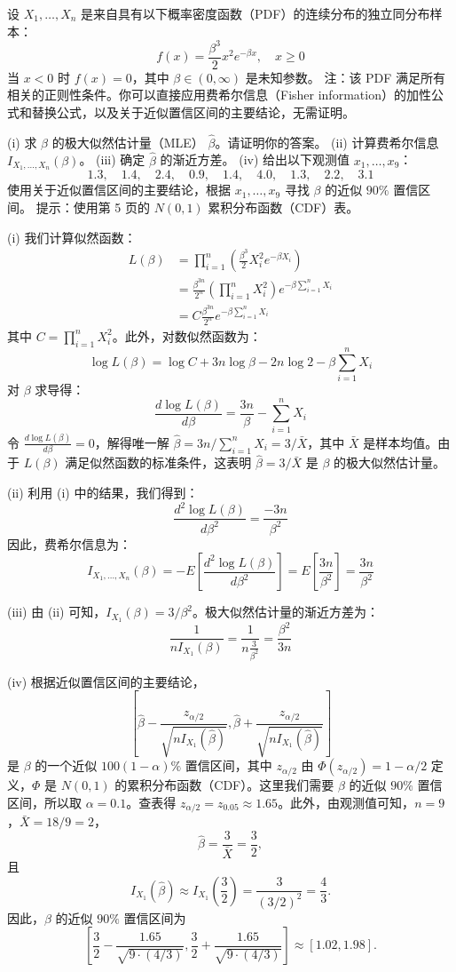 \begin{questions}
\question
设 $X_1, \dots, X_n$ 是来自具有以下概率密度函数（PDF）的连续分布的独立同分布样本：
\[
f(x) = \frac{\beta^3}{2} x^2 e^{-\beta x}, \quad x \ge 0
\]
当 $x < 0$ 时 $f(x) = 0$，其中 $\beta \in (0, \infty)$ 是未知参数。
注：该 PDF 满足所有相关的正则性条件。你可以直接应用费希尔信息（Fisher information）的加性公式和替换公式，以及关于近似置信区间的主要结论，无需证明。

(i) 求 $\beta$ 的极大似然估计量（MLE） $\hat{\beta}$。请证明你的答案。
(ii) 计算费希尔信息 $I_{X_1, \dots, X_n}(\beta)$。
(iii) 确定 $\hat{\beta}$ 的渐近方差。
(iv) 给出以下观测值 $x_1, \dots, x_9$：
\[
1.3, \quad 1.4, \quad 2.4, \quad 0.9, \quad 1.4, \quad 4.0, \quad 1.3, \quad 2.2, \quad 3.1
\]
使用关于近似置信区间的主要结论，根据 $x_1, \dots, x_9$ 寻找 $\beta$ 的近似 $90\%$ 置信区间。
提示：使用第 5 页的 $N(0, 1)$ 累积分布函数（CDF）表。

\begin{solution}
(i) 我们计算似然函数：
\begin{align*}
L(\beta) &= \prod_{i=1}^n \left( \frac{\beta^3}{2} X_i^2 e^{-\beta X_i} \right) \\
&= \frac{\beta^{3n}}{2^n} \left( \prod_{i=1}^n X_i^2 \right) e^{-\beta \sum_{i=1}^n X_i} \\
&= C \frac{\beta^{3n}}{2^n} e^{-\beta \sum_{i=1}^n X_i}
\end{align*}
其中 $C = \prod_{i=1}^n X_i^2$。此外，对数似然函数为：
\[
\log L(\beta) = \log C + 3n \log \beta - 2n \log 2 - \beta \sum_{i=1}^n X_i
\]
对 $\beta$ 求导得：
\[
\frac{d \log L(\beta)}{d\beta} = \frac{3n}{\beta} - \sum_{i=1}^n X_i
\]
令 $\frac{d \log L(\beta)}{d\beta} = 0$，解得唯一解 $\hat{\beta} = 3n / \sum_{i=1}^n X_i = 3/\bar{X}$，其中 $\bar{X}$ 是样本均值。由于 $L(\beta)$ 满足似然函数的标准条件，这表明 $\hat{\beta} = 3/\bar{X}$ 是 $\beta$ 的极大似然估计量。

(ii) 利用 (i) 中的结果，我们得到：
\[
\frac{d^2 \log L(\beta)}{d\beta^2} = \frac{-3n}{\beta^2}
\]
因此，费希尔信息为：
\[
I_{X_1, \dots, X_n}(\beta) = - E\left[ \frac{d^2 \log L(\beta)}{d\beta^2} \right] = E\left[ \frac{3n}{\beta^2} \right] = \frac{3n}{\beta^2}
\]

(iii) 由 (ii) 可知，$I_{X_1}(\beta) = 3/\beta^2$。极大似然估计量的渐近方差为：
\[
\frac{1}{n I_{X_1}(\beta)} = \frac{1}{n \frac{3}{\beta^2}} = \frac{\beta^2}{3n}
\]

(iv) 根据近似置信区间的主要结论，
\[
\left[ \hat{\beta} - \frac{z_{\alpha/2}}{\sqrt{n I_{X_1}(\hat{\beta})}}, \hat{\beta} + \frac{z_{\alpha/2}}{\sqrt{n I_{X_1}(\hat{\beta})}} \right]
\]
是 $\beta$ 的一个近似 $100(1-\alpha)\%$ 置信区间，其中 $z_{\alpha/2}$ 由 $\Phi(z_{\alpha/2}) = 1 - \alpha/2$ 定义，$\Phi$ 是 $N(0, 1)$ 的累积分布函数（CDF）。这里我们需要 $\beta$ 的近似 $90\%$ 置信区间，所以取 $\alpha = 0.1$。查表得 $z_{\alpha/2} = z_{0.05} \approx 1.65$。此外，由观测值可知，$n = 9$，$\bar{X} = 18/9 = 2$，
\[
\hat{\beta} = \frac{3}{\bar{X}} = \frac{3}{2},
\]
且
\[
I_{X_1}(\hat{\beta}) \approx I_{X_1} \left( \frac{3}{2} \right) = \frac{3}{(3/2)^2} = \frac{4}{3}.
\]
因此，$\beta$ 的近似 $90\%$ 置信区间为
\[
\left[ \frac{3}{2} - \frac{1.65}{\sqrt{9 \cdot (4/3)}}, \frac{3}{2} + \frac{1.65}{\sqrt{9 \cdot (4/3)}} \right] \approx [1.02, 1.98].
\]
\end{solution}


\end{questions}
